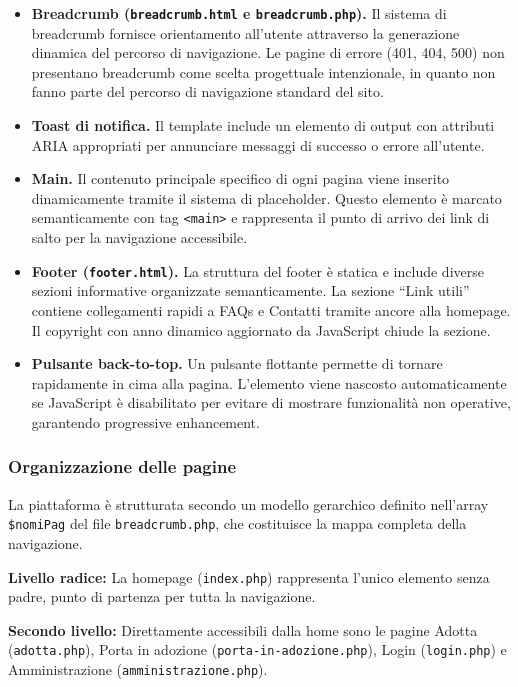\documentclass[a4paper,10pt]{article}
\begin{document}
\begin{itemize}
    \item \textbf{Breadcrumb (\texttt{breadcrumb.html} e \texttt{breadcrumb.php}).} 
    Il sistema di breadcrumb fornisce orientamento all'utente attraverso la generazione dinamica del percorso di navigazione. Le pagine di errore (401, 404, 500) non presentano breadcrumb come scelta progettuale intenzionale, in quanto non fanno parte del percorso di navigazione standard del sito.

    \item \textbf{Toast di notifica.} 
    Il template include un elemento di output con attributi ARIA appropriati per annunciare messaggi di successo o errore all'utente.

    \item \textbf{Main.} 
    Il contenuto principale specifico di ogni pagina viene inserito dinamicamente tramite il sistema di placeholder. Questo elemento è marcato semanticamente con tag \texttt{<main>} e rappresenta il punto di arrivo dei link di salto per la navigazione accessibile.

    \item \textbf{Footer (\texttt{footer.html}).} 
    La struttura del footer è statica e include diverse sezioni informative organizzate semanticamente. La sezione ``Link utili'' contiene collegamenti rapidi a FAQs e Contatti tramite ancore alla homepage. Il copyright con anno dinamico aggiornato da JavaScript chiude la sezione.

    \item \textbf{Pulsante back-to-top.} 
    Un pulsante flottante permette di tornare rapidamente in cima alla pagina. L'elemento viene nascosto automaticamente se JavaScript è disabilitato per evitare di mostrare funzionalità non operative, garantendo progressive enhancement.
    \end{itemize}

    \subsubsection{Organizzazione delle pagine}
    La piattaforma è strutturata secondo un modello gerarchico definito nell'array \texttt{\$nomiPag} del file \texttt{breadcrumb.php}, che costituisce la mappa completa della navigazione.

    \textbf{Livello radice:} La homepage (\texttt{index.php}) rappresenta l'unico elemento senza padre, punto di partenza per tutta la navigazione.

    \textbf{Secondo livello:} Direttamente accessibili dalla home sono le pagine Adotta (\texttt{adotta.php}), Porta in adozione (\texttt{porta-in-adozione.php}), Login (\texttt{login.php}) e Amministrazione (\texttt{amministrazione.php}).
\end{document}
